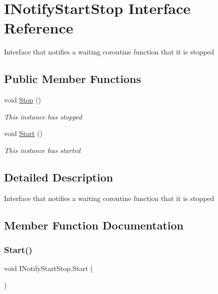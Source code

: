 \hypertarget{interface_i_notify_start_stop}{}\section{I\+Notify\+Start\+Stop Interface Reference}
\label{interface_i_notify_start_stop}


Interface that notifies a waiting coroutine function that it is stopped  


\subsection*{Public Member Functions}
\begin{DoxyCompactItemize}
\item 
void \hyperlink{interface_i_notify_start_stop_aae0b1a45988dd8e4f776036d444667de}{Stop} ()
\begin{DoxyCompactList}\small\item\em This instance has stopped \end{DoxyCompactList}\item 
void \hyperlink{interface_i_notify_start_stop_ab4fc473d26353954e5da2548894a25c4}{Start} ()
\begin{DoxyCompactList}\small\item\em This instance has started \end{DoxyCompactList}\end{DoxyCompactItemize}


\subsection{Detailed Description}
Interface that notifies a waiting coroutine function that it is stopped 



\subsection{Member Function Documentation}
\mbox{\label{interface_i_notify_start_stop_ab4fc473d26353954e5da2548894a25c4}} 
\subsubsection{\texorpdfstring{Start()}{Start()}}
{\footnotesize\ttfamily void I\+Notify\+Start\+Stop.\+Start (\begin{DoxyParamCaption}{ }\end{DoxyParamCaption})}



